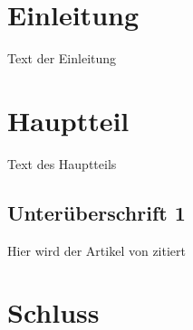 \documentclass[a4paper, 12pt]{article}
\begin{document}

\setcounter{page}{1}

\section{Einleitung} \label{einleitung}

Text der Einleitung


\section{Hauptteil}

Text des Hauptteils

\subsection{Unterüberschrift 1}

Hier wird der Artikel von \textcite{Abadi.2016} zitiert

\section{Schluss}


\newpage

\end{document}

